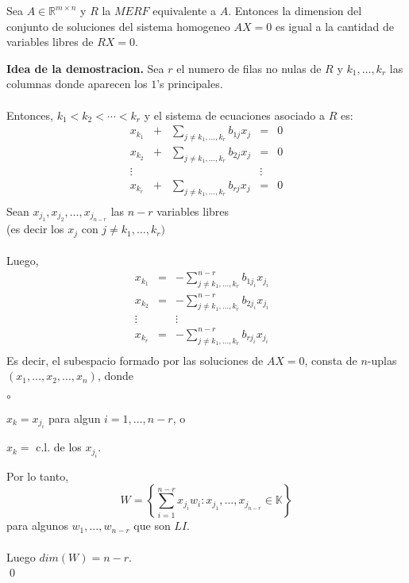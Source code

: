 \documentclass{article}
\theoremstyle{definition}
\theoremstyle{definition}
\theoremstyle{remark}
\begin{document}
\begin{lema}
Sea $A \in \mathbb{R}^{m \times n}$ y $R$ la $MERF$ equivalente a $A$. Entonces la dimension del conjunto de soluciones del sistema homogeneo $AX=0$ es igual a la cantidad de variables libres de $RX=0$.
\end{lema}
\textbf{Idea de la demostracion.} Sea $r$ el numero de filas no nulas de $R$ y $k_1, \dots ,k_r$ las columnas donde aparecen los $1$'s principales. \\\\ Entonces, $k_1 < k_2 < \cdots < k_r$ y el sistema de ecuaciones asociado a $R$ es: \[
  \begin{matrix}
    x_{k_1} & + & \sum_{j \neq k_1 ,\dots ,k_r } b_{1j}x_{j} & = & 0 \\
    x_{k_2} & + & \sum_{j \neq k_1 ,\dots ,k_r } b_{2j}x_{j} & = & 0 \\
   \vdots & & & \vdots \\
   x_{k_r} & + & \sum_{j \neq k_1 ,\dots ,k_r } b_{rj}x_{j} & = & 0 \\
  \end{matrix}
\]
Sean $x_{j_{1}},x_{j_{2}}, \dots ,x_{j_{n-r}}$ las $n-r$ variables libres \\(es decir los $x_j$ con $j \neq k_1, \dots , k_r)$ \\\\ Luego, 
\[
  \begin{matrix}
    x_{k_1} & = & -\sum_{j \neq k_1 ,\dots ,k_r }^{n-r} b_{1j_i}x_{j_i} &  \\
    x_{k_2} & = & -\sum_{j \neq k_1 ,\dots ,k_r }^{n-r} b_{2j_i}x_{j_i} &  \\
   \vdots & &  \vdots \\
   x_{k_r} & = & -\sum_{j \neq k_1 ,\dots ,k_r }^{n-r} b_{rj_i}x_{j_i} &  \\
  \end{matrix}
\]
Es decir, el subespacio formado por las soluciones de $AX=0$, consta de $n$-uplas $(x_1, \dots ,x_2 , \dots ,x_n)$, donde 
\begin{list}{$\circ$}{}  
\item $x_k=x_{j_{i}}$ para algun $i=1,\dots ,n-r$, o 
\item $x_k = $ c.l. de los $x_{j_{i}}$. 
\end{list}
Por lo tanto, \[
  W=\left\{\sum_{i=1}^{n-r}x_{j_{i}}w_{i}:x_{j_{1}}, \dots ,x_{j_{n-r}} \in \mathbb{K}\right\}
\]
para algunos $w_1, \dots ,w_{n-r}$ que son $LI$. \\\\ 
Luego $dim(W)=n-r$. \\ \qed
\end{document}
